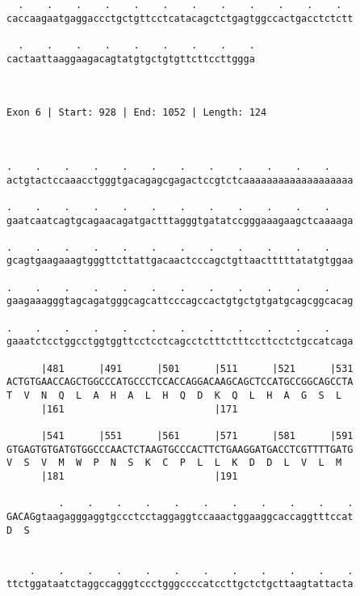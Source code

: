 \documentclass{article}
\begin{document}
\begin{Verbatim}
  .    .    .    .    .    .    .    .    .    .    .    .  
caccaagaatgaggaccctgctgttcctcatacagctctgagtggccactgacctctctt
                                                            
  .    .    .    .    .    .    .    .    .
cactaattaaggaagacagtatgtgctgtgttcttccttggga
                                           
                                           
 
Exon 6 | Start: 928 | End: 1052 | Length: 124



.    .    .    .    .    .    .    .    .    .    .    .    
actgtactccaaacctgggtgacagagcgagactccgtctcaaaaaaaaaaaaaaaaaaa
                                                            
.    .    .    .    .    .    .    .    .    .    .    .    
gaatcaatcagtgcagaacagatgactttagggtgatatccgggaaagaagctcaaaaga
                                                            
.    .    .    .    .    .    .    .    .    .    .    .    
gcagtgaagaaagtgggttcttattgacaactcccagctgttaactttttatatgtggaa
                                                            
.    .    .    .    .    .    .    .    .    .    .    .    
gaagaaagggtagcagatgggcagcattcccagccactgtgctgtgatgcagcggcacag
                                                            
.    .    .    .    .    .    .    .    .    .    .    .    
gaaatctcctggcctggtggttcctcctcagcctctttctttccttcctctgccatcaga
                                                            
      |481      |491      |501      |511      |521      |531
ACTGTGAACCAGCTGGCCCATGCCCTCCACCAGGACAAGCAGCTCCATGCCGGCAGCCTA
T  V  N  Q  L  A  H  A  L  H  Q  D  K  Q  L  H  A  G  S  L  
      |161                          |171                    
  
      |541      |551      |561      |571      |581      |591
GTGAGTGTGATGTGGCCCAACTCTAAGTGCCCACTTCTGAAGGATGACCTCGTTTTGATG
V  S  V  M  W  P  N  S  K  C  P  L  L  K  D  D  L  V  L  M  
      |181                          |191                    
  
         .    .    .    .    .    .    .    .    .    .    .
GACAGgtaagagggaggtgccctcctaggaggtccaaactggaaggcaccaggtttccat
D  S                                                        
                                                            
  
    .    .    .    .    .    .    .    .    .    .    .    .
ttctggataatctaggccagggtccctgggccccatccttgctctgcttaagtattacta
                                                            

\end{Verbatim}
\end{document}
